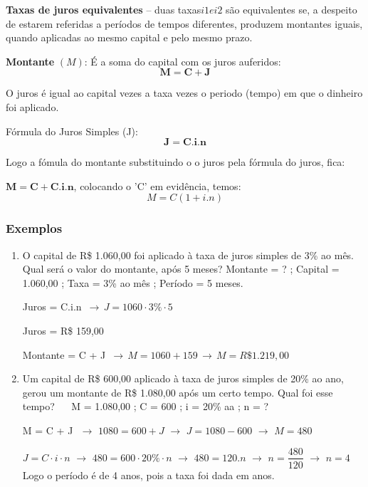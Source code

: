 \begin{multicols*}{2}
	\textbf{Taxas de juros equivalentes}  --  duas taxas$  i1 e i2$ são equivalentes se, a despeito de estarem referidas a períodos de tempos diferentes, produzem montantes iguais, quando aplicadas ao mesmo capital e pelo mesmo prazo.

	\textbf{Montante} $(M)$: É a soma do capital com os juros auferidos:
	\[\mathbf{M = C + J}\]

	O juros é igual ao capital vezes a taxa vezes o periodo (tempo) em que o dinheiro foi aplicado.

	Fórmula do Juros Simples (J):
	\[\mathbf{{J = C.i.n}}\]

	Logo a fómula do montante substituindo o o juros pela fórmula do juros, fica:

	$\mathbf{M = C + C.i.n}$, colocando o 'C' em evidência, temos:
	\[ M = C (1 + i.n) \]

	\subsubsection*{Exemplos}

	\begin{enumerate}[wide, labelwidth=!, labelindent=0pt]
		\item O capital de R\$ 1.060,00 foi aplicado à taxa de juros simples de 3\% ao mês. Qual será o valor do montante, após 5 meses?		Montante = ?  ;  Capital = 1.060,00  ;  Taxa = 3\% ao mês  ;  Período = 5 meses.

		      Juros = C.i.n  $\, \rightarrow \,  J = 1060 \cdot 3\% \cdot 5$

		      Juros = R\$ 159,00

		      Montante = C + J $ \, \rightarrow \, M = 1060 + 159 \, \rightarrow \, M = R\$1.219,00$

		\item Um capital de R\$ 600,00 aplicado à taxa de juros simples de 20\% ao ano, gerou  um  montante  de R\$ 1.080,00 após um certo tempo. Qual foi esse tempo?  $\, \, \, \, \, \, $  M = 1.080,00 ; C = 600 ; i = 20\% aa ; n = ?

		      M = C + J $\, \, \rightarrow \, \,  1080 = 600 + J \, \, \rightarrow \, \, J = 1080 - 600 \, \, \rightarrow \, \, M= 480$

		      $ J = C\cdot i \cdot n \, \, \rightarrow \, \, 480 = 600 \cdot 20\% \cdot n \, \, \rightarrow \, \, 480 = 120.n \, \, \rightarrow \, \, n = \dfrac{480}{120}\, \, \rightarrow \, \, n = 4 $ Logo o período é de 4 anos, pois a taxa foi dada em anos.


\end{enumerate}
\end{multicols*}
